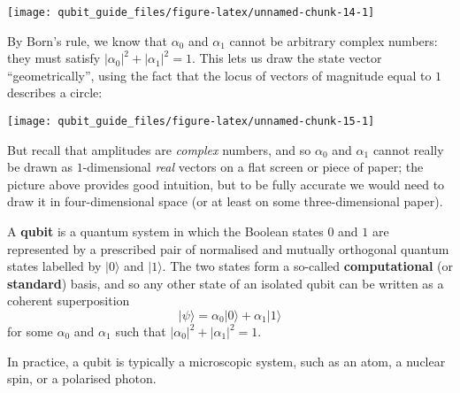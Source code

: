 \documentclass[fleqn]{article}
\newenvironment{idea}{\noindent}{\medskip}
\begin{document}
\begin{center}\texttt{[image: qubit\_guide\_files/figure-latex/unnamed-chunk-14-1]} \end{center}

By Born's rule, we know that \(\alpha_0\) and \(\alpha_1\) cannot be arbitrary complex numbers: they must satisfy \(|\alpha_0|^2+|\alpha_1|^2=1\).
This lets us draw the state vector ``geometrically'', using the fact that the locus of vectors of magnitude equal to \(1\) describes a circle:

\begin{center}\texttt{[image: qubit\_guide\_files/figure-latex/unnamed-chunk-15-1]} \end{center}

But recall that amplitudes are \emph{complex} numbers, and so \(\alpha_0\) and \(\alpha_1\) cannot really be drawn as \(1\)-dimensional \emph{real} vectors on a flat screen or piece of paper;
the picture above provides good intuition, but to be fully accurate we would need to draw it in four-dimensional space (or at least on some three-dimensional paper).

\begin{idea}
A \textbf{qubit} is a quantum system in which the Boolean states \(0\) and \(1\) are represented by a prescribed pair of normalised and mutually orthogonal quantum states labelled by \(|0\rangle\) and \(|1\rangle\).
The two states form a so-called \textbf{computational} (or \textbf{standard}) basis, and so any other state of an isolated qubit can be written as a coherent superposition
\[
  |\psi\rangle = \alpha_0|0\rangle + \alpha_1|1\rangle
\]
for some \(\alpha_0\) and \(\alpha_1\) such that \(|\alpha_0|^2 + |\alpha_1|^2 = 1\).

In practice, a qubit is typically a microscopic system, such as an atom, a nuclear spin, or a polarised photon.

\end{idea}
\end{document}
